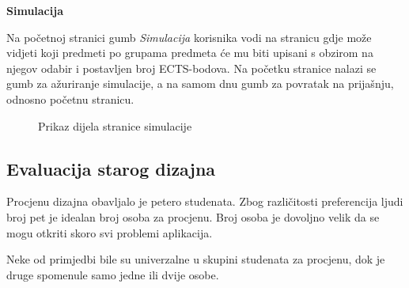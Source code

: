 \documentclass[times, utf8, zavrsni, numeric]{fer}
\begin{document}
        
        
        \vspace{\baselineskip}
        \bigbreak
        \noindent\textbf{Simulacija}
        
        Na početnoj stranici gumb \textit{Simulacija} korisnika vodi na stranicu gdje može vidjeti koji predmeti po grupama predmeta će mu biti upisani s obzirom na njegov odabir i postavljen broj ECTS-bodova. Na početku stranice nalazi se gumb za ažuriranje simulacije, a na samom dnu gumb za povratak na prijašnju, odnosno početnu stranicu.
        
        \begin{figure} [H]
          \centering
          \caption{Prikaz dijela stranice simulacije}
        \end{figure}


        \subsection{Evaluacija starog dizajna}
        Procjenu dizajna obavljalo je petero studenata. Zbog različitosti preferencija ljudi broj pet je idealan broj osoba za procjenu. Broj osoba je dovoljno velik da se mogu otkriti skoro svi problemi aplikacija.
        
        Neke od primjedbi bile su univerzalne u skupini studenata za procjenu, dok je druge spomenule samo jedne ili dvije osobe.
        
\end{document}
